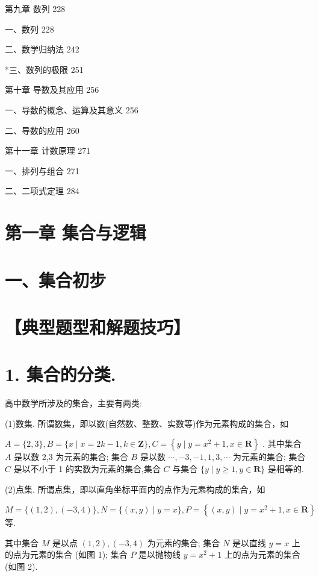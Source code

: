 \documentclass[10pt]{article}
\begin{document}
第九章 数列 228

一、数列 228

二、数学归纳法 242

*三、数列的极限 251

第十章 导数及其应用 256

一、导数的概念、运算及其意义 256

二、导数的应用 260

第十一章 计数原理 271

一、排列与组合 271

二、二项式定理 284

\section*{第一章 集合与逻辑}

\section*{一、集合初步}

\section*{【典型题型和解题技巧】}

\section*{1. 集合的分类.}

高中数学所涉及的集合，主要有两类:

(1)数集. 所谓数集，即以数(自然数、整数、实数等)作为元素构成的集合，如

\(A = \{ 2,3\} ,B = \{ x \mid  x = {2k} - 1,k \in  \mathbf{Z}\} ,C = \left\{  {y \mid  y = {x}^{2} + 1,x \in  \mathbf{R}}\right\}\) . 其中集合 \(A\) 是以数 2,3 为元素的集合; 集合 \(B\) 是以数 \(\cdots , - 3, - 1,1,3,\cdots\) 为元素的集合; 集合 \(C\) 是以不小于 1 的实数为元素的集合,集合 \(C\) 与集合 \(\{ y \mid  y \geq  1,y \in  \mathbf{R}\}\) 是相等的.

(2)点集. 所谓点集，即以直角坐标平面内的点作为元素构成的集合，如

\(M = \{ \left( {1,2}\right) ,\left( {-3,4}\right) \} ,N = \{ \left( {x,y}\right)  \mid  y = x\} ,P = \left\{  {\left( {x,y}\right)  \mid  y = {x}^{2} + 1,x \in  \mathbf{R}}\right\}\) 等.

其中集合 \(M\) 是以点 \(\left( {1,2}\right) ,\left( {-3,4}\right)\) 为元素的集合; 集合 \(N\) 是以直线 \(y = x\) 上的点为元素的集合 (如图 1); 集合 \(P\) 是以抛物线 \(y = {x}^{2} + 1\) 上的点为元素的集合 (如图 2).
\end{document}
